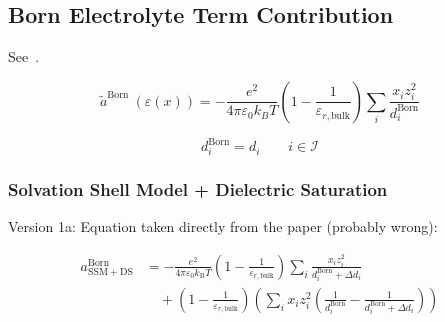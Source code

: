 \documentclass[12pt, letterpaper]{article}
\begin{document}
\subsection{Born Electrolyte Term Contribution}

See~\cite{Bulow2021a}.

\begin{equation}
    \tilde{a}^{\text {Born }}(\varepsilon(x))=-\frac{e^2}{4 \pi \varepsilon_{0} k_{B} T}\left(1-\frac{1}{\varepsilon_{r,\mathrm{bulk}}}\right) \sum_{i} \frac{x_{i} z_{i}^2}{d^{\text{Born}}_{i}}
    \label{eq:ares_born}
\end{equation}


\begin{equation}
    d^{\text{Born}}_{i} = d_{i} \qquad i\in\mathcal{I}
    \label{eq:d_born_equals_d}
\end{equation}

\subsubsection{Solvation Shell Model + Dielectric Saturation}

Version 1a: Equation taken directly from the paper (probably wrong):~\cite{Figiel2025}


\begin{equation}
    \begin{aligned}
        a_{\mathrm{SSM+DS}}^{\mathrm{Born}}
        &=-\frac{e^{2}}{4\pi\varepsilon_{0}k_{\mathrm{B}}T}
        \left(1-\frac{1}{\varepsilon_{r,\mathrm{bulk}}}\right)
        \sum_{i}\frac{x_{i}z_{i}^{2}}{d_{i}^{\mathrm{Born}}+\Delta d_{i}}
        \\
        &\quad +\left(1-\frac{1}{\varepsilon_{r,\mathrm{bulk}}}\right)
        \left(\sum_{i}x_{i}z_{i}^{2}
        \left(\frac{1}{d_{i}^{\mathrm{Born}}}-\frac{1}{d_{i}^{\mathrm{Born}}+\Delta d_{i}}\right)\right)
    \end{aligned}
    \label{eq:ares_born_ssmds_v1}
\end{equation}
\end{document}
